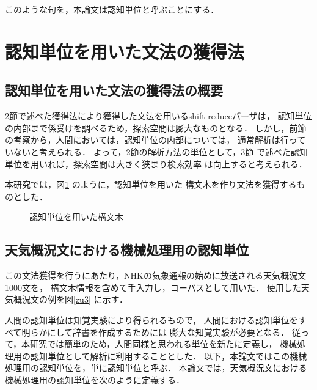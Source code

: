 このような句を，本論文は認知単位と呼ぶことにする\cite{yoko}．


\section{認知単位を用いた文法の獲得法}

\subsection{認知単位を用いた文法の獲得法の概要}

2節で述べた獲得法により獲得した文法を用いるshift-reduceパーザは，
認知単位の内部まで係受けを調べるため，探索空間は膨大なものとなる．
しかし，前節の考察から，人間においては，認知単位の内部については，
通常解析は行っていないと考えられる．
よって，2節の解析方法の単位として，3節
で述べた認知単位を用いれば，探索空間は大きく狭まり検索効率
は向上すると考えられる．

本研究では，図{\ref{zu3a}} のように，認知単位を用いた
構文木を作り文法を獲得するものとした．

\begin{figure}[htb]
\begin{center}

\end{center}
\caption{認知単位を用いた構文木} \label{zu3a}
\end{figure}

\subsection{天気概況文における機械処理用の認知単位}

この文法獲得を行うにあたり，NHKの気象通報の始めに放送される天気概況文1000文を，
構文木情報を含めて手入力し，コーパスとして用いた．
使用した天気概況文の例を図\ref{zu3} に示す．

人間の認知単位は知覚実験により得られるもので，
人間における認知単位をすべて明らかにして辞書を作成するためには
膨大な知覚実験が必要となる．
従って，本研究では簡単のため，人間同様と思われる単位を新たに定義し，
機械処理用の認知単位として解析に利用することとした．
以下，本論文ではこの機械処理用の認知単位を，単に認知単位と呼ぶ．
本論文では，天気概況文における機械処理用の認知単位を次のように定義する．

